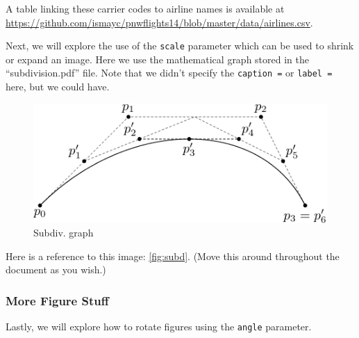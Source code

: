 \documentclass[12pt,twoside]{reedthesis}
\begin{document}
  A table linking these carrier codes to airline names is available at
  \url{https://github.com/ismayc/pnwflights14/blob/master/data/airlines.csv}.
  
  \clearpage
  
  Next, we will explore the use of the \texttt{scale} parameter which can
  be used to shrink or expand an image. Here we use the mathematical graph
  stored in the ``subdivision.pdf'' file. Note that we didn't specify the
  \texttt{caption\ =} or \texttt{label\ =} here, but we could have.
  
  \begin{Shaded}
  \begin{Highlighting}[]
  \NormalTok{(}\NormalTok{, }\NormalTok{, }\NormalTok{, }
         \NormalTok{)}
  \end{Highlighting}
  \end{Shaded}
  
  \begin{figure}[h!tbp]
  \centering
  \includegraphics[angle = 0,scale = 0.75]{figure/subdivision.pdf}
  \caption[Subdiv. graph]{\normalsize{Subdiv. graph}}
  \label{fig:subd}
  \end{figure}
  
  Here is a reference to this image: \autoref{fig:subd}. (Move this around
  throughout the document as you wish.)
  
  \subsubsection{More Figure Stuff}\label{more-figure-stuff-1}
  
  Lastly, we will explore how to rotate figures using the \texttt{angle}
  parameter.
  
  \begin{Shaded}
  \begin{Highlighting}[]
  \NormalTok{(}\NormalTok{, }
        \NormalTok{, }
         \NormalTok{,}
         \NormalTok{,}
         \NormalTok{)}
  \end{Highlighting}
  \end{Shaded}
  
\end{document}
